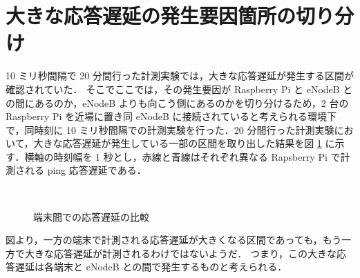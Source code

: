 \documentclass[a4j]{jarticle}
\begin{document}
\section{大きな応答遅延の発生要因箇所の切り分け}
10 ミリ秒間隔で 20 分間行った計測実験では，大きな応答遅延が発生する区間が確認されていた．
そこでここでは，その発生要因が Raspberry Pi と eNodeB との間にあるのか，eNodeB よりも向こう側にあるのかを切り分けるため，2 台の Raspberry Pi を近場に置き同 eNodeB に接続されていると考えられる環境下で，同時刻に 10 ミリ秒間隔での計測実験を行った．20 分間行った計測実験において，大きな応答遅延が発生している一部の区間を取り出した結果を図 \ref{comp} に示す．横軸の時刻幅を 1 秒とし，赤線と青線はそれぞれ異なる Rapsberry Pi で計測される ping 応答遅延である．
\begin{figure}[tb]
\begin{center}
~
~
\caption{端末間での応答遅延の比較}
\label{comp}
\end{center}
\end{figure}
図より，一方の端末で計測される応答遅延が大きくなる区間であっても，もう一方で大きな応答遅延が計測されるわけではないようだ．
つまり，この大きな応答遅延は各端末と eNodeB との間で発生するものと考えられる．
\end{document}
